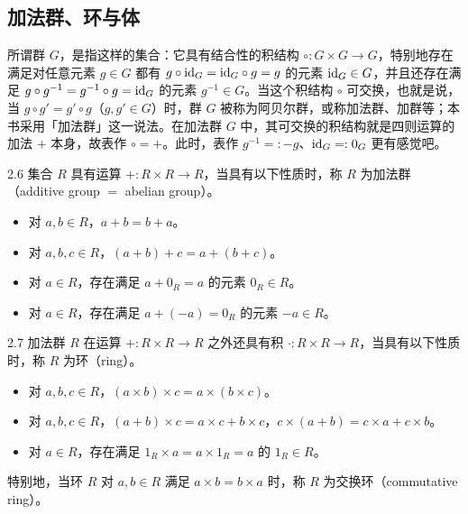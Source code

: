 \subsection{加法群、环与体}

所谓群 $G$，是指这样的集合：它具有结合性的积结构 $\circ\colon G\times G\to G$，特别地存在满足对任意元素 $g\in G$ 都有 $g\circ\mathrm{id}_G=\mathrm{id}_G\circ g=g$ 的元素 $\mathrm{id}_G\in G$，并且还存在满足 $g\circ g^{-1}=g^{-1}\circ g=\mathrm{id}_G$ 的元素 $g^{-1}\in G$。当这个积结构 $\circ$ 可交换，也就是说，当 $g\circ g'=g'\circ g$（$g,g'\in G$）时，群 $G$ 被称为阿贝尔群，或称加法群、加群等；本书采用「加法群」这一说法。在加法群 $G$ 中，其可交换的积结构就是四则运算的加法 $+$ 本身，故表作 $\circ=+$。此时，表作 $g^{-1}=:-g$、$\mathrm{id}_G=:0_G$ 更有感觉吧。



\begin{definition}{2.6} 集合 $R$ 具有运算 $+\colon R\times R\to R$，当具有以下性质时，称 $R$ 为加法群（additive group $=$ abelian group）。
\begin{itemize}
  \item 对 $a,b\in R$，$a+b=b+a$。
  \item 对 $a,b,c\in R$，$(a+b)+c=a+(b+c)$。
  \item 对 $a\in R$，存在满足 $a+0_R=a$ 的元素 $0_R\in R$。
  \item 对 $a\in R$，存在满足 $a+(-a)=0_R$ 的元素 $-a\in R$。
\end{itemize}
\end{definition}

\begin{definition}{2.7} 加法群 $R$ 在运算 $+\colon R\times R\to R$ 之外还具有积 $\cdot\colon R\times R\to R$，当具有以下性质时，称 $R$ 为环（ring）。
\begin{itemize}
  \item 对 $a,b,c\in R$，$(a\times b)\times c=a\times(b\times c)$。
  \item 对 $a,b,c\in R$，$(a+b)\times c=a\times c+b\times c$，$c\times(a+b)=c\times a+c\times b$。
  \item 对 $a\in R$，存在满足 $1_R\times a=a\times1_R=a$ 的 $1_R\in R$。
\end{itemize}
特别地，当环 $R$ 对 $a,b\in R$ 满足 $a\times b=b\times a$ 时，称 $R$ 为交换环（commutative ring）。\end{definition}

